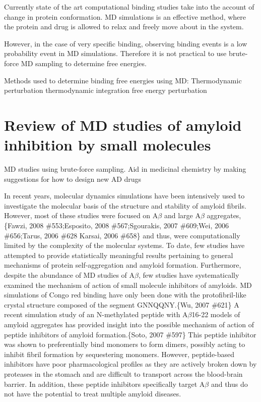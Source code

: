 \begin{outline}
	\1 Currently state of the art computational binding studies take into the account of change in protein conformation. MD simulations is an effective method, where the protein and drug is allowed to relax and freely move about in the system.

	\1 However, in the case of very specific binding, observing binding events is a low probability event in MD simulations. Therefore it is not practical to use brute-force MD sampling to determine free energies.

	  \2 Methods used to determine binding free energies using MD:
	  	\3 Thermodynamic perturbation \cite{Gilson:2007hz}
			\4 thermodynamic integration
			\4 free energy perturbation
\end{outline}

\section{Review of MD studies of amyloid inhibition by small molecules}
MD studies using brute-force sampling. Aid in medicinal chemistry by making suggestions for how to design new AD drugs

\begin{outline}
	\1 In recent years, molecular dynamics simulations have been intensively used to investigate the molecular basis of the structure and stability of amyloid fibrils. However, most of these studies were focused on A$\beta$ and large A$\beta$ aggregates,\{Fawzi, 2008 \#553;Esposito, 2008 \#567;Sgourakis, 2007 \#609;Wei, 2006 \#656;Tarus, 2006 \#628 Karsai, 2006 \#658\} and thus, were computationally limited by the complexity of the molecular systems. To date, few studies have attempted to provide statistically meaningful results pertaining to general mechanisms of protein self-aggregation and amyloid formation. Furthermore, despite the abundance of MD studies of A$\beta$, few studies have systematically examined the mechanism of action of small molecule inhibitors of amyloids. MD simulations of Congo red binding have only been done with the protofibril-like crystal structure composed of the segment GNNQQNY.\{Wu, 2007 \#621\} A recent simulation study of an N-methylated peptide with A$\beta$16-22 models of amyloid aggregates has provided insight into the possible mechanism of action of peptide inhibitors of amyloid formation.\{Soto, 2007 \#597\} This peptide inhibitor was shown to preferentially bind monomers to form dimers, possibly acting to inhibit fibril formation by sequestering monomers. However, peptide-based inhibitors have poor pharmacological profiles as they are actively broken down by proteases in the stomach and are difficult to transport across the blood-brain barrier. In addition, these peptide inhibitors specifically target A$\beta$ and thus do not have the potential to treat multiple amyloid diseases.
\end{outline}


